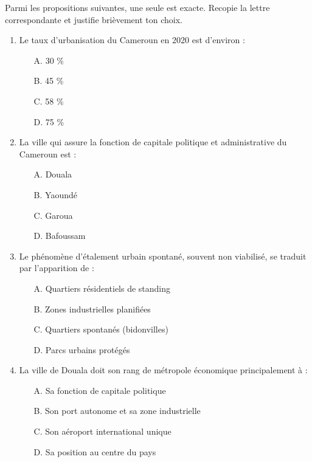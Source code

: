 \documentclass[11pt]{article}
\begin{document}
\begin{exercice}
Parmi les propositions suivantes, une seule est exacte. Recopie la lettre correspondante et justifie brièvement ton choix.
\begin{enumerate}
    \item Le taux d'urbanisation du Cameroun en 2020 est d'environ :
    \begin{itemize}
        \item[A.] 30 \%
        \item[B.] 45 \%
        \item[C.] 58 \%
        \item[D.] 75 \%
    \end{itemize}
    \item La ville qui assure la fonction de capitale politique et administrative du Cameroun est :
    \begin{itemize}
        \item[A.] Douala
        \item[B.] Yaoundé
        \item[C.] Garoua
        \item[D.] Bafoussam
    \end{itemize}
    \item Le phénomène d'étalement urbain spontané, souvent non viabilisé, se traduit par l'apparition de :
    \begin{itemize}
        \item[A.] Quartiers résidentiels de standing
        \item[B.] Zones industrielles planifiées
        \item[C.] Quartiers spontanés (bidonvilles)
        \item[D.] Parcs urbains protégés
    \end{itemize}
    \item La ville de Douala doit son rang de métropole économique principalement à :
    \begin{itemize}
        \item[A.] Sa fonction de capitale politique
        \item[B.] Son port autonome et sa zone industrielle
        \item[C.] Son aéroport international unique
        \item[D.] Sa position au centre du pays
    \end{itemize}
\end{enumerate}
\end{exercice}
\end{document}
